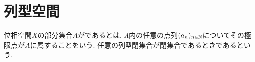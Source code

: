 \documentclass[uplatex, dvipdfmx, a4paper, 12pt, class=jsbook, crop=false]{standalone}
\begin{document}
\section{列型空間}
\label{sec:sequential-spaces}

\begin{definition}
	位相空間$ X $の部分集合$ A $がであるとは,
	$ A $内の任意の点列$ (a_n)_{n \in \mathbb{N}} $についてその極限点が$ A $に属することをいう.
	任意の列型閉集合が閉集合であるときであるという.
\end{definition}
\end{document}
